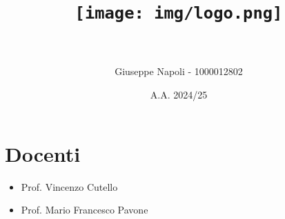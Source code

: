 \documentclass[12pt]{article}
\title{
  \texttt{[image: img/logo.png]}\\
  \vspace{1cm}
  \materia\\
  \projectName
}
\author{Giuseppe Napoli - 1000012802}
\date{A.A. 2024/25}
\newcommand{\docenteUno}{Prof. Vincenzo Cutello}
\newcommand{\docenteDue}{Prof. Mario Francesco Pavone}
\begin{document}
\maketitle

\section*{Docenti}
\begin{itemize}
  \item \docenteUno
  \item \docenteDue
\end{itemize}

\newpage
\tableofcontents
\newpage

\newpage

\newpage

\newpage

\newpage

\end{document}
